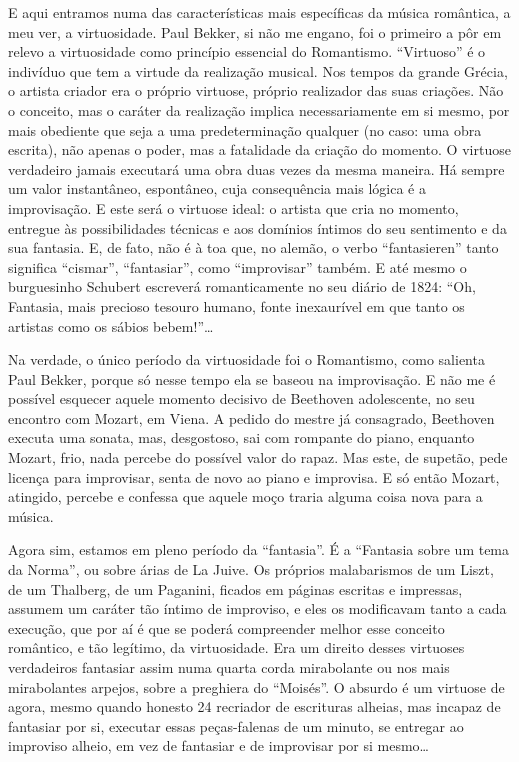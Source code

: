 E aqui entramos numa das características mais específicas da música
romântica, a meu ver, a virtuosidade. Paul Bekker, si não me engano, foi
o primeiro a pôr em relevo a virtuosidade como princípio essencial do
Romantismo. ``Virtuoso'' é o indivíduo que tem a virtude da realização
musical. Nos tempos da grande Grécia, o artista criador era o próprio
virtuose, próprio realizador das suas criações. Não o conceito, mas o
caráter da realização implica necessariamente em si mesmo, por mais
obediente que seja a uma predeterminação qualquer (no caso: uma obra
escrita), não apenas o poder, mas a fatalidade da criação do momento. O
virtuose verdadeiro jamais executará uma obra duas vezes da mesma
maneira. Há sempre um valor instantâneo, espontâneo, cuja consequência
mais lógica é a improvisação. E este será o virtuose ideal: o artista
que cria no momento, entregue às possibilidades técnicas e aos domínios
íntimos do seu sentimento e da sua fantasia. E, de fato, não é à toa
que, no alemão, o verbo ``fantasieren'' tanto significa ``cismar'',
``fantasiar'', como ``improvisar'' também. E até mesmo o burguesinho
Schubert escreverá romanticamente no seu diário de 1824: ``Oh, Fantasia,
mais precioso tesouro humano, fonte inexaurível em que tanto os artistas
como os sábios bebem!''\ldots{}

Na verdade, o único período da virtuosidade foi o Romantismo, como
salienta Paul Bekker, porque só nesse tempo ela se baseou na
improvisação. E não me é possível esquecer aquele momento decisivo de
Beethoven adolescente, no seu encontro com Mozart, em Viena. A pedido do
mestre já consagrado, Beethoven executa uma sonata, mas, desgostoso, sai
com rompante do piano, enquanto Mozart, frio, nada percebe do possível
valor do rapaz. Mas este, de supetão, pede licença para improvisar,
senta de novo ao piano e improvisa. E só então Mozart, atingido, percebe
e confessa que aquele moço traria alguma coisa nova para a música.

Agora sim, estamos em pleno período da ``fantasia''. É a ``Fantasia
sobre um tema da Norma'', ou sobre árias de La Juive. Os próprios
malabarismos de um Liszt, de um Thalberg, de um Paganini, ficados em
páginas escritas e impressas, assumem um caráter tão íntimo de
improviso, e eles os modificavam tanto a cada execução, que por aí é que
se poderá compreender melhor esse conceito romântico, e tão legítimo, da
virtuosidade. Era um direito desses virtuoses verdadeiros fantasiar
assim numa quarta corda mirabolante ou nos mais mirabolantes arpejos,
sobre a preghiera do ``Moisés''. O absurdo é um virtuose de agora, mesmo
quando honesto 24 recriador de escrituras alheias, mas incapaz de
fantasiar por si, executar essas peças-falenas de um minuto, se entregar
ao improviso alheio, em vez de fantasiar e de improvisar por si mesmo\ldots{}

